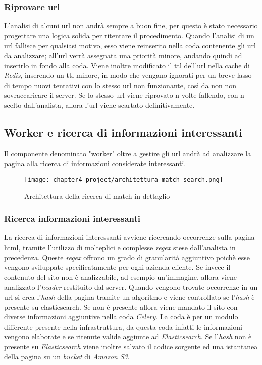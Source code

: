 \subsubsection{Riprovare url}

L'analisi di alcuni url non andrà sempre a buon fine, per questo è stato necessario progettare una logica solida per ritentare il procedimento. Quando l'analisi di un url fallisce per qualsiasi motivo, esso viene reinserito nella coda contenente gli url da analizzare; all'url verrà assegnata una priorità minore, andando quindi ad inserirlo in fondo alla coda. Viene inoltre modificato il \gls{ttl} dell'url nella cache di \emph{Redis}, inserendo un \gls{ttl} minore, in modo che vengano ignorati per un breve lasso di tempo nuovi tentativi con lo stesso url non funzionante, così da non non sovraccaricare il server. Se lo stesso url viene riprovato n volte fallendo, con n scelto dall'analista, allora l'url viene scartato definitivamente.


\subsection{Worker e ricerca di informazioni interessanti}

Il componente denominato "worker" oltre a gestire gli url andrà ad analizzare la pagina alla ricerca di informazioni considerate interessanti.
\begin{figure}[!h] 
    \centering 
    \texttt{[image: chapter4-project/architettura-match-search.png]} 
    \caption{Architettura della ricerca di match in dettaglio}
\end{figure}

\subsubsection{Ricerca informazioni interessanti}

La ricerca di informazioni interessanti avviene ricercando occorrenze sulla pagina html, tramite l'utilizzo di molteplici e complesse \emph{regex} stese dall'analista in precedenza. Queste \emph{regex} offrono un grado di granularità aggiuntivo poichè esse vengono sviluppate specificatamente per ogni azienda cliente. Se invece il contenuto del sito non è analizzabile, ad esempio un'immagine, allora viene analizzato l'\emph{header} restituito dal server. Quando vengono trovate occorrenze in un url si crea l'\emph{hash} della pagina tramite un algoritmo e viene controllato se l'\emph{hash} è presente su elasticsearch. Se non è presente allora viene mandato il sito con diverse informazioni aggiuntive nella coda \emph{Celery}. La coda è per un modulo differente presente nella infrastruttura, da questa coda infatti le informazioni vengono elaborate e se ritenute valide aggiunte ad \emph{Elasticsearch}. \newline{}
Se l'\emph{hash} non è presente su \emph{Elasticsearch} viene inoltre salvato il codice sorgente ed una istantanea della pagina su un \emph{bucket} di \emph{Amazon S3}.
